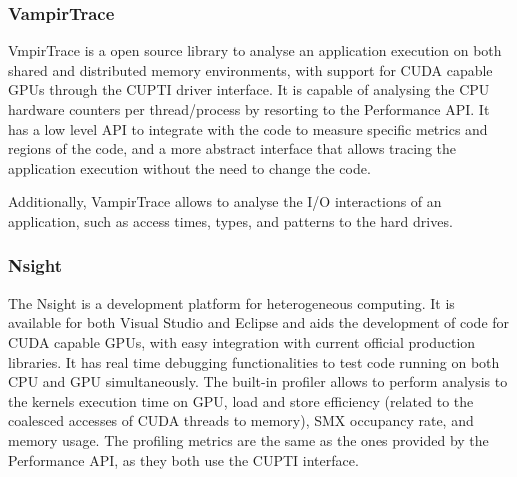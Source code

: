 \subsubsection*{VampirTrace}

VmpirTrace \cite{VampirTrace} is a open source library to analyse an application execution on both shared and distributed memory environments, with support for CUDA capable GPUs through the CUPTI driver interface. It is capable of analysing the CPU hardware counters per thread/process by resorting to the Performance API. It has a low level API to integrate with the code to measure specific metrics and regions of the code, and a more abstract interface that allows tracing the application execution without the need to change the code.

Additionally, VampirTrace allows to analyse the I/O interactions of an application, such as access times, types, and patterns to the hard drives.

\subsubsection*{\nvidia Nsight}

The \nvidia Nsight \cite{NVIDIA:Nsight} is a development platform for heterogeneous computing. It is available for both Visual Studio and Eclipse and aids the development of code for CUDA capable GPUs, with easy integration with current official production libraries. It has real time debugging functionalities to test code running on both CPU and GPU simultaneously. The built-in profiler allows to perform analysis to the kernels execution time on GPU, load and store efficiency (related to the coalesced accesses of CUDA threads to memory), SMX occupancy rate, and memory usage. The profiling metrics are the same as the ones provided by the Performance API, as they both use the \nvidia CUPTI interface.
